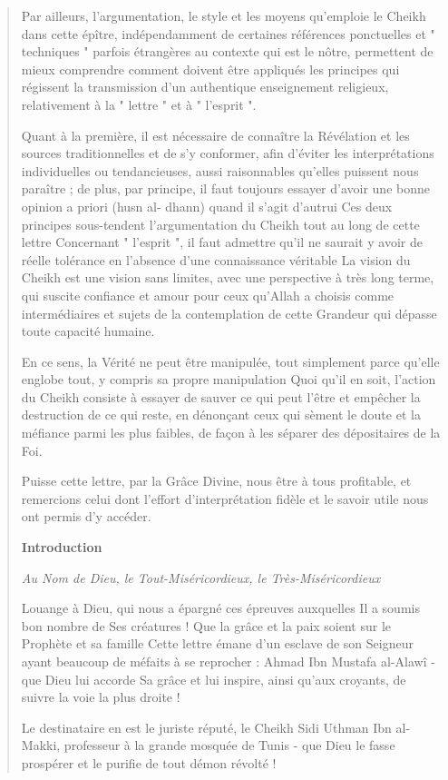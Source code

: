 \begin{quote}
Par ailleurs, l'argumentation, le style et les moyens qu'emploie le
Cheikh dans cette épître, indépendamment de certaines références
ponctuelles et " techniques " parfois étrangères au contexte qui est le
nôtre, permettent de mieux comprendre comment doivent être appliqués les
principes qui régissent la transmission d'un authentique enseignement
religieux, relativement à la " lettre " et à " l'esprit ".

Quant à la première, il est nécessaire de connaître la Révélation et les
sources traditionnelles et de s'y conformer, afin d'éviter les
interprétations individuelles ou tendancieuses, aussi raisonnables
qu'elles puissent nous paraître ; de plus, par principe, il faut
toujours essayer d'avoir une bonne opinion a priori (husn al- dhann)
quand il s'agit d'autrui Ces deux principes sous-tendent l'argumentation
du Cheikh tout au long de cette lettre Concernant " l'esprit ", il faut
admettre qu'il ne saurait y avoir de réelle tolérance en l'absence d'une
connaissance véritable La vision du Cheikh est une vision sans limites,
avec une perspective à très long terme, qui suscite confiance et amour
pour ceux qu'Allah a choisis comme intermédiaires et sujets de la
contemplation de cette Grandeur qui dépasse toute capacité humaine.

En ce sens, la Vérité ne peut être manipulée, tout simplement parce
qu'elle englobe tout, y compris sa propre manipulation Quoi qu'il en
soit, l'action du Cheikh consiste à essayer de sauver ce qui peut l'être
et empêcher la destruction de ce qui reste, en dénonçant ceux qui sèment
le doute et la méfiance parmi les plus faibles, de façon à les séparer
des dépositaires de la Foi.

Puisse cette lettre, par la Grâce Divine, nous être à tous profitable,
et remercions celui dont l'effort d'interprétation fidèle et le savoir
utile nous ont permis d'y accéder.

\textbf{Introduction}

\emph{Au Nom de Dieu, le Tout-Miséricordieux, le Très-Miséricordieux}

Louange à Dieu, qui nous a épargné ces épreuves auxquelles Il a soumis
bon nombre de Ses créatures ! Que la grâce et la paix soient sur le
Prophète et sa famille Cette lettre émane d'un esclave de son Seigneur
ayant beaucoup de méfaits à se reprocher : Ahmad Ibn Mustafa al-Alawî -
que Dieu lui accorde Sa grâce et lui inspire, ainsi qu'aux croyants, de
suivre la voie la plus droite !

Le destinataire en est le juriste réputé, le Cheikh Sidi Uthman Ibn
al-Makki, professeur à la grande mosquée de Tunis - que Dieu le fasse
prospérer et le purifie de tout démon révolté !


\end{quote}
